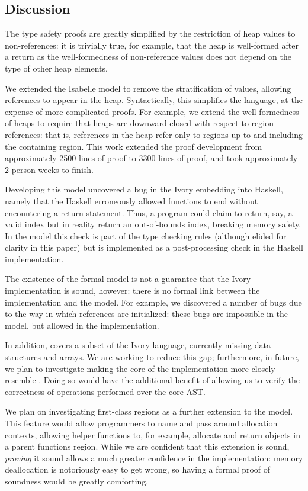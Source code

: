 \subsection{Discussion}
\label{sec:sem-discuss}

The type safety proofs are greatly simplified by the restriction of
heap values to non-references: it is trivially true, for example, that
the heap is well-formed after a return as the well-formedness of
non-reference values does not depend on the type of other heap
elements.

We extended the Isabelle model to remove the stratification of values,
allowing references to appear in the heap.  Syntactically, this
simplifies the language, at the expense of more complicated proofs.
For example, we extend the well-formedness of heaps to require that
heaps are downward closed with respect to region references: that is,
references in the heap refer only to regions up to and including the
containing region.  This work extended the proof development from
approximately 2500 lines of proof to 3300 lines of proof, and took
approximately 2 person weeks to finish.

Developing this model uncovered a bug in the Ivory embedding into
Haskell, namely that the Haskell erroneously allowed functions to
end without encountering a return statement.  Thus, a program could
claim to return, say, a valid index but in reality return an
out-of-bounds index, breaking memory safety.  In the model this
check is part of the type checking rules (although elided for clarity
in this paper) but is implemented as a post-processing check in the
Haskell implementation.  

The existence of the formal model is not a guarantee that the Ivory
implementation is sound, however: there is no formal link between the
implementation and the model.  For example, we discovered a number of
bugs due to the way in which references are initialized: these bugs
are impossible in the model, but allowed in the implementation.  

In addition, \coreivory{} covers a subset of the Ivory language,
currently missing data structures and arrays.  We are working to
reduce this gap; furthermore, in future, we plan to investigate making
the core of the implementation more closely resemble \coreivory{}.
Doing so would have the additional benefit of allowing us to verify
the correctness of operations performed over the core AST.

We plan on investigating first-class regions as a further extension to
the model.  This feature would allow programmers to name and pass
around allocation contexts, allowing helper functions to, for example,
allocate and return objects in a parent functions region.  While we
are confident that this extension is sound, \emph{proving} it sound
allows a much greater confidence in the implementation: memory
deallocation is notoriously easy to get wrong, so having a formal
proof of soundness would be greatly comforting.
